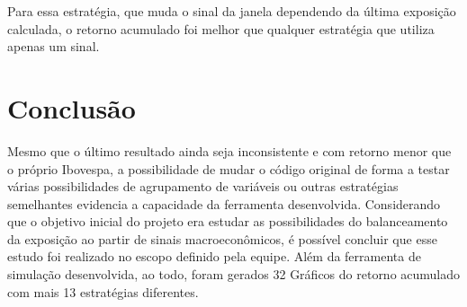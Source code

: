 Para essa estratégia, que muda o sinal da janela dependendo da última exposição calculada, o retorno acumulado foi melhor que qualquer estratégia que utiliza apenas um sinal. 

\section{Conclusão}

Mesmo que o último resultado ainda seja inconsistente e com retorno menor que o próprio Ibovespa, a possibilidade de mudar o código original de forma a testar várias possibilidades de agrupamento de variáveis ou outras estratégias semelhantes evidencia a capacidade da ferramenta desenvolvida. Considerando que o objetivo inicial do projeto era estudar as possibilidades do balanceamento da exposição ao partir de sinais macroeconômicos, é possível concluir que esse estudo foi realizado no escopo definido pela equipe. Além da ferramenta de simulação desenvolvida, ao todo, foram gerados 32 Gráficos do retorno acumulado com mais 13 estratégias diferentes.
